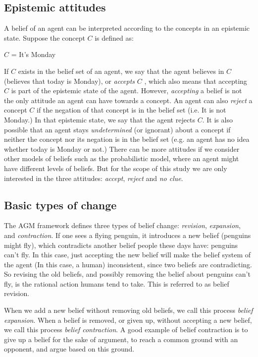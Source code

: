 \subsection{Epistemic attitudes}
\label{epistemicAttitudes}
A belief of an agent can be interpreted according to the concepts in an epistemic state. Suppose the concept $C$ is defined as:
\begin{center}
$C$ = It's Monday
\end{center}
If $C$ exists in the belief set of an agent, we say that the agent believes in $C$ (believes that today is Monday), or \textit{accepts} $C$ \cite{flux}, which also means that accepting $C$ is part of the epistemic state of the agent. However, \textit{accepting} a belief is not the only attitude an agent can have towards a concept. An agent can also \textit{reject} a concept $C$ if the negation of that concept is in the belief set (i.e. It is not Monday.) In that epistemic state, we say that the agent rejects $C$. It is also possible that an agent stays \textit{undetermined} (or ignorant) about a concept if neither the concept nor its negation is in the belief set (e.g. an agent has no idea whether today is Monday or not.) There can be more attitudes if we consider other models of beliefs such as the probabilistic model, where an agent might have different levels of beliefs. But for the scope of this study we are only interested in the three attitudes: \textit{accept}, \textit{reject} and \textit{no clue}.

\subsection{Basic types of change}
The AGM framework defines three types of belief change: \textit{revision}, \textit{expansion}, and \textit{contraction}. If one sees a flying penguin, it introduces a new belief (penguins might fly), which contradicts another belief people these days have: penguins can't fly. In this case, just accepting the new belief will make the belief system of the agent (In this case, a human) inconsistent, since two beliefs are contradicting. So revising the old beliefs, and possibly removing the belief about penguins can't fly, is the rational action humans tend to take. This is referred to as belief revision.

When we add a new belief without removing old beliefs, we call this process \textit{belief expansion}. When a belief is removed, or given up, without accepting a new belief, we call this process \textit{belief contraction}. A good example of belief contraction is to give up a belief for the sake of argument, to reach a common ground with an opponent, and argue based on this ground.

